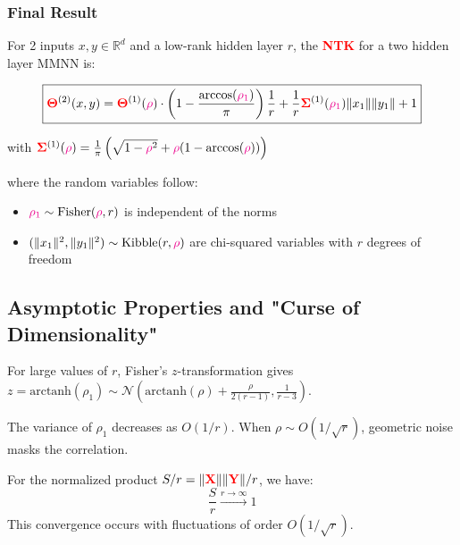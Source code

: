 \documentclass[a4paper]{article}
\theoremstyle{plain}
\theoremstyle{definition}
\theoremstyle{remark}
\begin{document}
\subsubsection{Final Result}

\begin{tcolorbox}[colback=personalcontribcolor!10,colframe=personalcontribcolor,title={\textbf{MAIN RESULT}},enhanced,drop shadow,breakable]
For 2 inputs $x,y \in \mathbb{R}^d$ and a low-rank hidden layer $r$, the \textcolor{red}{\textbf{NTK}} for a two hidden layer MMNN is:

\begin{equation}
\boxed{\textcolor{red}{\boldsymbol{\Theta}}^{(2)}(x,y) = \textcolor{red}{\boldsymbol{\Theta}}^{(1)}(\textcolor{magenta}{\rho}) \cdot \left(1 - \frac{\arccos(\textcolor{magenta}{\rho_1})}{\pi}\right)\frac{1}{r} + \frac{1}{r}\textcolor{red}{\boldsymbol{\Sigma}}^{(1)}(\textcolor{magenta}{\rho_1})\|x_1\| \|y_1\| + 1}
\end{equation}

with $\textcolor{red}{\boldsymbol{\Sigma}}^{(1)}(\textcolor{magenta}{\rho}) = \frac{1}{\pi}\left(\sqrt{1-\textcolor{magenta}{\rho}^2} + \textcolor{magenta}{\rho}(1-\arccos(\textcolor{magenta}{\rho}))\right)$

where the random variables follow:
\begin{itemize}
\item $\textcolor{magenta}{\rho_1} \sim \text{Fisher}(\textcolor{magenta}{\rho}, r)$ is independent of the norms
\item $(\|x_1\|^2, \|y_1\|^2) \sim \text{Kibble}(r, \textcolor{magenta}{\rho})$ are chi-squared variables with $r$ degrees of freedom
\end{itemize}
\end{tcolorbox} 

\subsection{Asymptotic Properties and "Curse of Dimensionality"}

\begin{tcolorbox}[colback=green!10,colframe=green,title={\textbf{High-Dimensional Behavior}},enhanced]
For large values of $r$, Fisher's $z$-transformation gives $z = \text{arctanh}(\rho_1) \sim \mathcal{N}\left(\text{arctanh}(\rho) + \frac{\rho}{2(r-1)}, \frac{1}{r-3}\right)$. 

The variance of $\rho_1$ decreases as $O(1/r)$. When $\rho \sim O(1/\sqrt{r})$, geometric noise masks the correlation.

For the normalized product $S/r = \|\textcolor{red}{\mathbf{X}}\|\|\textcolor{red}{\mathbf{Y}}\|/r$, we have:
\begin{equation}
\boxed{\frac{S}{r} \xrightarrow{r \to \infty} 1}
\end{equation}
This convergence occurs with fluctuations of order $O(1/\sqrt{r})$.
\end{tcolorbox}
\end{document}
